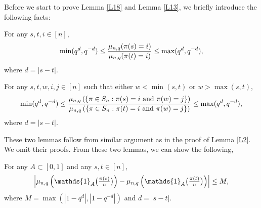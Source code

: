 


Before we start to prove Lemma \ref{L18} and Lemma \ref{L13}, we briefly introduce the following facts:
\begin{lemma}\label{L14}
For any $s, t, i \in [n]$,
\[
\min( q^d, q^{-d}) \le \frac{\mu_{n, q}(\pi(s)=i)}{\mu_{n, q}(\pi(t)=i)}\le \max( q^d, q^{-d}),
\]
where $d = |s-t|$.
\end{lemma}
\begin{lemma}\label{L15}
For any $s, t, w, i, j \in [n]$ such that either $w < \min{(s, t)}$ or $w > \max{(s, t)}$,
\[
\min( q^d, q^{-d}) \le \frac{ \mu_{n, q} \left( \{ \pi \in S_n : \pi(s)= i \text{ and } \pi(w) = j \}\right) }
    {\mu_{n, q} \left( \{ \pi \in S_n : \pi(t)= i \text{ and } \pi(w) = j \}\right) } \le \max( q^d, q^{-d}),
\]
where $d = |s-t|$.
\end{lemma}

These two lemmas follow from similar argument as in the proof of Lemma \ref{L2}. We omit their proofs. From these two lemmas, we can show the following,
\begin{lemma}\label{L16}
For any $A \subset [0, 1]$ and any $s, t \in [n]$,
\[
\textstyle\left|\m \left( \mathds{1}_A \big(\frac{\pi(s)}{n} \big) \right) -
     \m \left( \mathds{1}_A \big(\frac{\pi(t)}{n} \big)\right)\right| \le M,
\]
where $M = \max{(|1-q^d|, |1 - q^{-d}|)}$ and $d = |s-t|$.
\end{lemma}

